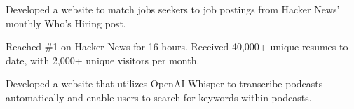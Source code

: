 \documentclass[]{deedy-resume-openfont}
\begin{document}
\hfill{}
\begin{tightemize}
\item Developed a website to match jobs seekers to job postings from Hacker News’ monthly Who’s Hiring post. 
\item Reached \#1 on Hacker News for 16 hours. Received 40,000+ unique resumes to date, with 2,000+ unique visitors per month. 
\end{tightemize}
\sectionsep

\hfill{}
\begin{tightemize}
\item Developed a website that utilizes OpenAI Whisper to transcribe podcasts automatically and enable users to search for keywords within podcasts.
\end{tightemize}
\sectionsep




\end{document}
